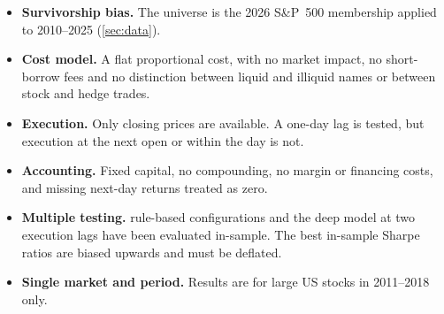 \begin{itemize}
  \item \textbf{Survivorship bias.} The universe is the 2026 S\&P~500 membership applied to
        2010--2025 (\cref{sec:data}).
  \item \textbf{Cost model.} A flat proportional cost, with no market impact, no short-borrow
        fees and no distinction between liquid and illiquid names or between stock and hedge
        trades.
  \item \textbf{Execution.} Only closing prices are available. A one-day lag is tested, but
        execution at the next open or within the day is not.
  \item \textbf{Accounting.} Fixed capital, no compounding, no margin or financing costs, and
        missing next-day returns treated as zero.
  \item \textbf{Multiple testing.} \NVariants{} rule-based configurations and the deep model at two
        execution lags have been evaluated in-sample. The best in-sample Sharpe ratios are biased
        upwards and must be deflated.
  \item \textbf{Single market and period.} Results are for large US stocks in 2011--2018 only.
\end{itemize}

